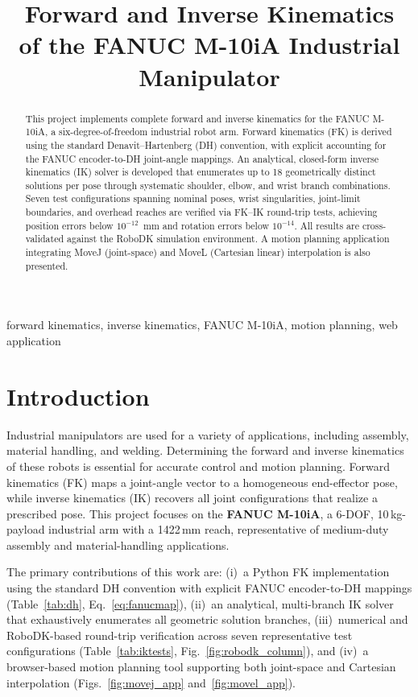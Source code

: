 \documentclass[conference]{IEEEtran}
\title{Forward and Inverse Kinematics\\of the FANUC M-10iA Industrial Manipulator}
\author{
\IEEEauthorblockN{Jessica Sillus}
\IEEEauthorblockA{ME 7751 Project 1\\
The Ohio State University\\
Email: sillus.1@osu.edu}
}
\begin{document}
\maketitle

\begin{abstract}
This project implements complete forward and inverse kinematics for the FANUC M-10iA, a six-degree-of-freedom industrial robot arm.
Forward kinematics (FK) is derived using the standard Denavit--Hartenberg (DH) convention, with explicit accounting for the FANUC encoder-to-DH joint-angle mappings.
An analytical, closed-form inverse kinematics (IK) solver is developed that enumerates up to 18 geometrically distinct solutions per pose through systematic shoulder, elbow, and wrist branch combinations.
Seven test configurations spanning nominal poses, wrist singularities, joint-limit boundaries, and overhead reaches are verified via FK--IK round-trip tests, achieving position errors below $10^{-12}$~mm and rotation errors below $10^{-14}$.
All results are cross-validated against the RoboDK simulation environment.
A motion planning application integrating MoveJ (joint-space) and MoveL (Cartesian linear) interpolation is also presented.
\end{abstract}

\begin{IEEEkeywords}
forward kinematics, inverse kinematics, FANUC M-10iA, motion planning, web application
\end{IEEEkeywords}

\section{Introduction}

Industrial manipulators are used for a variety of applications, including assembly, material handling, and welding. Determining the forward and inverse kinematics of these robots is essential for accurate control and motion planning.
Forward kinematics (FK) maps a joint-angle vector to a homogeneous end-effector pose, while inverse kinematics (IK) recovers all joint configurations that realize a prescribed pose.
This project focuses on the \textbf{FANUC M-10iA}, a 6-DOF, 10\,kg-payload industrial arm with a 1422\,mm reach, representative of medium-duty assembly and material-handling applications.

The primary contributions of this work are:
(i)~a Python FK implementation using the standard DH convention with explicit FANUC encoder-to-DH mappings (Table~\ref{tab:dh}, Eq.~\eqref{eq:fanucmap}),
(ii)~an analytical, multi-branch IK solver that exhaustively enumerates all geometric solution branches,
(iii)~numerical and RoboDK-based round-trip verification across seven representative test configurations (Table~\ref{tab:iktests}, Fig.~\ref{fig:robodk_column}), and
(iv)~a browser-based motion planning tool supporting both joint-space and Cartesian interpolation (Figs.~\ref{fig:movej_app} and~\ref{fig:movel_app}).
\end{document}
